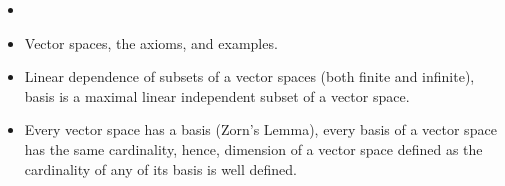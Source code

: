  \begin{recall}
    \begin{itemize}
        \item[]
        \item Vector spaces, the axioms, and examples.
        \item \quad Linear dependence of subsets of a vector spaces (both finite and infinite), basis is a maximal linear independent subset of a vector space.
        \quad\item Every vector space has a basis (Zorn's Lemma), every basis of a vector space has the same cardinality, hence, dimension of a vector space defined as the cardinality of any of its basis is well defined.
    \end{itemize}
\end{recall}

